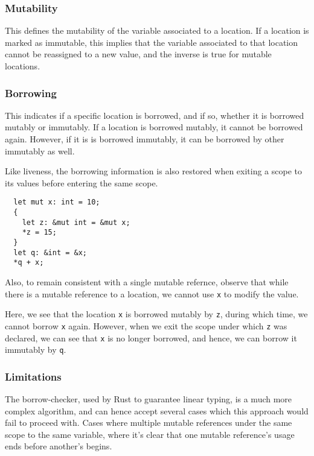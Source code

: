 \documentclass[review,twocolumn]{sigplanconf}
\begin{document}
\subsubsection{Mutability}

This defines the mutability of the variable associated to a location. If a location is marked as immutable, this implies that the variable associated to that location cannot be reassigned to a new value, and the inverse is true for mutable locations.

\subsubsection{Borrowing}

This indicates if a specific location is borrowed, and if so, whether it is borrowed mutably or immutably. If a location is borrowed mutably, it cannot be borrowed again. However, if it is is borrowed immutably, it can be borrowed by other immutably as well.

Like liveness, the borrowing information is also restored when exiting a scope to its values before entering the same scope.

\begin{verbatim}
  let mut x: int = 10;
  {
    let z: &mut int = &mut x;
    *z = 15;
  }
  let q: &int = &x;
  *q + x;
\end{verbatim}

Also, to remain consistent with a single mutable refernce, observe that while there is a mutable reference to a location, we cannot use \verb!x! to modify the value.

Here, we see that the location \verb!x! is borrowed mutably by \verb!z!, during which time, we cannot borrow \verb!x! again. However, when we exit the scope under which \verb!z! was declared, we can see that \verb!x! is no longer borrowed, and hence, we can borrow it immutably by \verb!q!.

\subsubsection{Limitations}

The borrow-checker, used by Rust to guarantee linear typing, is a much more complex algorithm, and can hence accept several cases which this approach would fail to proceed with. Cases where multiple mutable references under the same scope to the same variable, where it's clear that one mutable reference's usage ends before another's begins.
\end{document}
